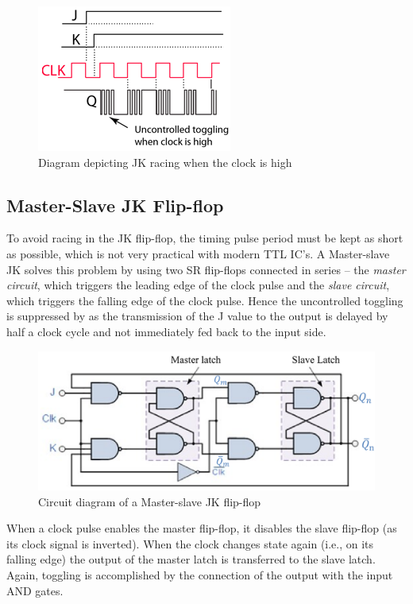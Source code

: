 \begin{figure}[H]
    \centering
    \includegraphics[width=0.55\columnwidth]{images/jkrace1.png}
    \caption{Diagram depicting JK racing when the clock is high}
    \label{race}
\end{figure}

\subsection*{Master-Slave JK Flip-flop}
To avoid racing in the JK flip-flop, the timing pulse period must be kept as short as possible, which is not very practical with modern TTL IC's. A Master-slave JK solves this problem by using two SR flip-flops connected in series -- the \textit{master circuit}, which triggers the leading edge of the clock pulse and the \textit{slave circuit}, which triggers the falling edge of the clock pulse. Hence the uncontrolled toggling is suppressed by as the transmission of the J value to the output is delayed by half a clock cycle and not immediately fed back to the input side.

\begin{figure}[H]
    \centering
    \includegraphics[width=0.90\columnwidth]{images/msjk.png}
    \caption{Circuit diagram of a Master-slave JK flip-flop}
    \label{5}
\end{figure}

When a clock pulse enables the master flip-flop, it disables the slave flip-flop (as its clock signal is inverted). When the clock
changes state again (i.e., on its falling edge) the output of the master latch is transferred
to the slave latch. Again, toggling is accomplished by the connection of the output with
the input AND gates.

